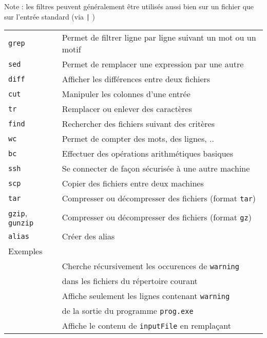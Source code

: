 \documentclass [a4paper]{article}
\begin{document}
Note : les filtres peuvent généralement être utilisés aussi bien sur un fichier que sur l'entrée standard (via \og \verb+|+ \fg{})
\noindent
\begin{tabular}{ ll }
\hline
{\verb+grep+}                 & Permet de filtrer ligne par ligne suivant un mot ou un motif\\
{\verb+sed+}                  & Permet de remplacer une expression par une autre\\
{\verb+diff+}                 & Afficher les différences entre deux fichiers\\
{\verb+cut+}                  & Manipuler les colonnes d'une entrée\\
{\verb+tr+}                   & Remplacer ou enlever des caractères\\
{\verb+find+}                 & Rechercher des fichiers suivant des critères\\
{\verb+wc+}                   & Permet de compter des mots, des lignes, ..\\
{\verb+bc+}                   & Effectuer des opérations arithmétiques basiques\\
{\verb+ssh+}                  & Se connecter de façon sécurisée à une autre machine\\
{\verb+scp+}                  & Copier des fichiers entre deux machines \\
{\verb+tar+}                  & Compresser ou décompresser des fichiers (format \verb+tar+)\\
{\verb+gzip+, \verb+gunzip+}  & Compresser ou décompresser des fichiers (format \verb+gz+)\\
{\verb+alias+}                & Créer des alias\\
\hline
Exemples                                         & \\
\hspace{0.5cm}{\verb+grep -nr "warning" ./+}              & Cherche récursivement les occurences de \verb+warning+\\
                                                          & dans les fichiers du répertoire courant\\
\hspace{0.5cm}{\verb+./prog.exe | grep "warning"+}        & Affiche seulement les lignes contenant \verb+warning+\\
                                                          & de la sortie du programme \verb+prog.exe+\\
\hspace{0.5cm}{\verb+sed "s/search/replace/g" inputFile+} & Affiche le contenu de \verb+inputFile+ en remplaçant \\

\end{tabular}
\end{document}
